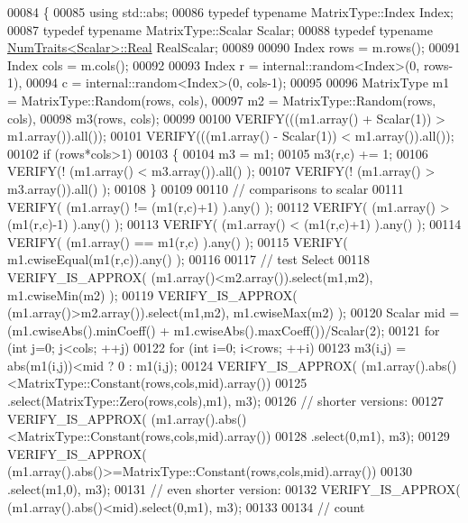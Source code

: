 \begin{DoxyCode}
00084 \{
00085   \textcolor{keyword}{using} std::abs;
00086   \textcolor{keyword}{typedef} \textcolor{keyword}{typename} MatrixType::Index Index;
00087   \textcolor{keyword}{typedef} \textcolor{keyword}{typename} MatrixType::Scalar Scalar;
00088   \textcolor{keyword}{typedef} \textcolor{keyword}{typename} \hyperlink{group___core___module_struct_eigen_1_1_num_traits}{NumTraits<Scalar>::Real} RealScalar;
00089 
00090   Index rows = m.rows();
00091   Index cols = m.cols();
00092 
00093   Index r = internal::random<Index>(0, rows-1),
00094         c = internal::random<Index>(0, cols-1);
00095 
00096   MatrixType m1 = MatrixType::Random(rows, cols),
00097              m2 = MatrixType::Random(rows, cols),
00098              m3(rows, cols);
00099 
00100   VERIFY(((m1.array() + Scalar(1)) > m1.array()).all());
00101   VERIFY(((m1.array() - Scalar(1)) < m1.array()).all());
00102   \textcolor{keywordflow}{if} (rows*cols>1)
00103   \{
00104     m3 = m1;
00105     m3(r,c) += 1;
00106     VERIFY(! (m1.array() < m3.array()).all() );
00107     VERIFY(! (m1.array() > m3.array()).all() );
00108   \}
00109 
00110   \textcolor{comment}{// comparisons to scalar}
00111   VERIFY( (m1.array() != (m1(r,c)+1) ).any() );
00112   VERIFY( (m1.array() > (m1(r,c)-1) ).any() );
00113   VERIFY( (m1.array() < (m1(r,c)+1) ).any() );
00114   VERIFY( (m1.array() == m1(r,c) ).any() );
00115   VERIFY( m1.cwiseEqual(m1(r,c)).any() );
00116 
00117   \textcolor{comment}{// test Select}
00118   VERIFY\_IS\_APPROX( (m1.array()<m2.array()).select(m1,m2), m1.cwiseMin(m2) );
00119   VERIFY\_IS\_APPROX( (m1.array()>m2.array()).select(m1,m2), m1.cwiseMax(m2) );
00120   Scalar mid = (m1.cwiseAbs().minCoeff() + m1.cwiseAbs().maxCoeff())/Scalar(2);
00121   \textcolor{keywordflow}{for} (\textcolor{keywordtype}{int} j=0; j<cols; ++j)
00122   \textcolor{keywordflow}{for} (\textcolor{keywordtype}{int} i=0; i<rows; ++i)
00123     m3(i,j) = abs(m1(i,j))<mid ? 0 : m1(i,j);
00124   VERIFY\_IS\_APPROX( (m1.array().abs()<MatrixType::Constant(rows,cols,mid).array())
00125                         .select(MatrixType::Zero(rows,cols),m1), m3);
00126   \textcolor{comment}{// shorter versions:}
00127   VERIFY\_IS\_APPROX( (m1.array().abs()<MatrixType::Constant(rows,cols,mid).array())
00128                         .select(0,m1), m3);
00129   VERIFY\_IS\_APPROX( (m1.array().abs()>=MatrixType::Constant(rows,cols,mid).array())
00130                         .select(m1,0), m3);
00131   \textcolor{comment}{// even shorter version:}
00132   VERIFY\_IS\_APPROX( (m1.array().abs()<mid).select(0,m1), m3);
00133 
00134   \textcolor{comment}{// count}

\end{DoxyCode}

